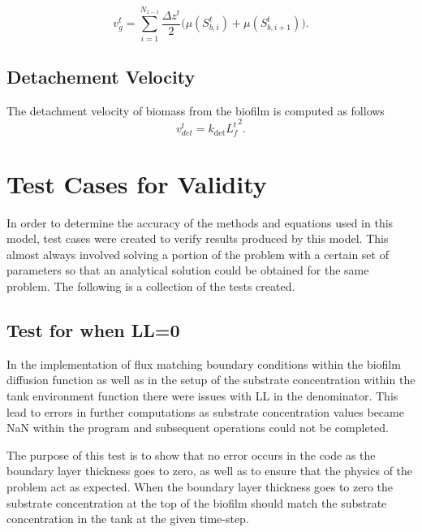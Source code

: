 \documentclass[letterpaper, twoside]{article}
\numberwithin{equation}{section}
\begin{document}
\begin{equation}
  \label{eq:vg_sum}
  {v_g^{t}}={\sum_{i=1}^{N_{z-1}}  {\frac{\Delta {z^{t}}}{2}}  ( {\mu({S_{b,i}^{t}})+\mu({S_{b,i+1}^{t}})}}).
\end{equation}

\subsection{Detachement Velocity}
The detachment velocity of biomass from the biofilm is computed as follows
\begin{equation}
  \label{eq:vdet2}
  {v_{det}^{t}}={k_{\mathrm{det}}{L^t_f}^2}.
\end{equation}

\section{Test Cases for Validity}
In order to determine the accuracy of the methods and equations used in this model, test cases were created to verify results produced by this model. This almost always involved solving a portion of the problem with a certain set of parameters so that an analytical solution could be obtained for the same problem. The following is a collection of the tests created.

\subsection{Test for when LL=0}
In the implementation of flux matching boundary conditions within the biofilm diffusion function as well as in the setup of the substrate concentration within the tank environment function there were issues with LL in the denominator. This lead to errors in further computations as substrate concentration values became NaN within the program and subsequent operations could not be completed.

The purpose of this test is to show that no error occurs in the code as the boundary layer thickness goes to zero, as well as to ensure that the physics of the problem act as expected. When the boundary layer thickness goes to zero the substrate concentration at the top of the biofilm should match the substrate concentration in the tank at the given time-step.
\end{document}
